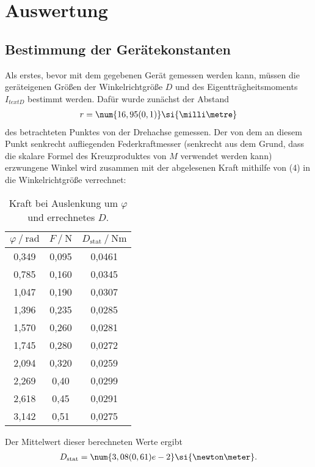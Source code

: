 \section{Auswertung}
\label{sec:Auswertung}

\subsection{Bestimmung der Gerätekonstanten}
\label{sub:subsection label}

Als erstes, bevor mit dem gegebenen Gerät gemessen werden kann, müssen die geräteigenen Größen 
der Winkelrichtgröße $D$ und des Eigentträgheitsmoments $I_{text{D}}$ bestimmt werden.
Dafür wurde zunächst der Abstand 
\begin{align*}
  r = \num{16,95(0,1)}\si{\milli\metre}
\end{align*} 
des betrachteten Punktes von der Drehachse gemessen.
Der von dem an diesem Punkt senkrecht aufliegenden Federkraftmesser (senkrecht aus dem Grund, dass die skalare Formel des Kreuzproduktes von $M$  verwendet werden kann)
erzwungene Winkel wird zusammen mit der abgelesenen Kraft mithilfe von (4) in die Winkelrichtgröße verrechnet:
\begin{table}
\centering
\caption{Kraft bei Auslenkung um $\varphi$ und errechnetes $D$.}
\begin{tabular}{ S[table-format=1,3] S[table-format=1,3] S[table-format=1,4]}
\toprule
$\varphi\:/\:\text{rad}$ & $F\:/\:\si{\newton}$ & $D_{\text{stat}}\:/\:\si{\newton \metre}$\\
\midrule

0,349  &  0,095 & 0,0461\\
0,785  &  0,160 & 0,0345\\
1,047  &  0,190 & 0,0307\\
1,396  &  0,235 & 0,0285\\
1,570  &  0,260 & 0,0281\\
1,745  &  0,280 & 0,0272\\
2,094  &  0,320 & 0,0259\\
2,269  &  0,40  & 0,0299\\
2,618  &  0,45  & 0,0291\\
3,142  &  0,51  & 0,0275\\
\bottomrule
\end{tabular}
\end{table}

Der Mittelwert dieser berechneten Werte ergibt 
\begin{align*}
  D_{\text{stat}} = \num{3,08(0,61)e-2}\si{\newton\meter}.
\end{align*}

